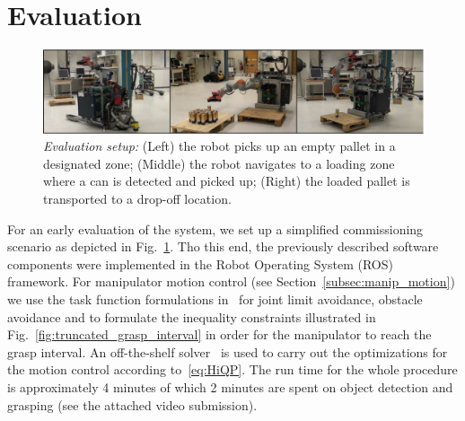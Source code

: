 \section{Evaluation}
\label{sec:eval}
% 
\begin{figure}[t!]
  \begin{center}
    \includegraphics[width =1\linewidth]{figs/evaluation}
    \caption{\textit{Evaluation setup:} (Left) the robot picks up an empty pallet in a designated
      zone; (Middle) the robot navigates to a loading zone where a can is detected and picked up;
      (Right) the loaded pallet is transported to a drop-off location.}
    \label{fig:evaluation}
  \end{center}
\end{figure}
% 
For an early evaluation of the system, we set up a simplified commissioning scenario as depicted in
Fig.~\ref{fig:evaluation}. Tho this end, the previously described software components were
implemented in the Robot Operating System (ROS)~\cite{Quig09} framework. For manipulator motion
control (see Section~\ref{subsec:manip_motion}) we use the task function formulations
in~\cite{Kano09} for joint limit avoidance, obstacle avoidance and to formulate the inequality
constraints illustrated in Fig.~\ref{fig:truncated_grasp_interval} in order for the manipulator to
reach the grasp interval. An off-the-shelf solver~\cite{Guro15} is used to carry out the
optimizations for the motion control according to~\eqref{eq:HiQP}. The run time for the whole
procedure is approximately 4 minutes of which 2 minutes are spent on object detection and grasping
(see the attached video submission).


